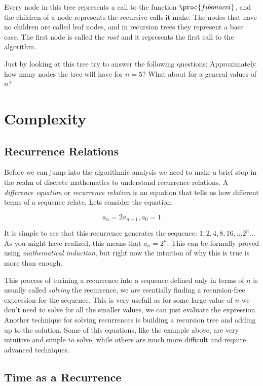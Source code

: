 \documentclass{article}
\begin{document}
Every node in this tree represents a call to the function $\proc{fibonacci}$, and the children of a node represents the recursive calls it make. The nodes that have no children are called leaf nodes, and in recursion trees they represent a base case. The first node is called the \textit{root} and it represents the first call to the algorithm.

Just by looking at this tree try to answer the following questions: Approximately how many nodes the tree will have for $n = 5$? What about for a general values of $n$?

\section{Complexity}

\subsection{Recurrence Relations}

Before we can jump into the algorithmic analysis we need to make a brief stop in the realm of discrete mathematics to understand recurrence relations. A \textit{difference equation} or \textit{recurrence relation} is an equation that tells us how different terms of a sequence relate. Lets consider the equation:

$$a_n = 2 a_{n - 1}, a_0 = 1$$

It is simple to see that this recurrence generates the sequence: $1, 2, 4, 8, 16, \dots 2^n \dots$ As you might have realized, this means that $a_n = 2^n$. This can be formally proved using \textit{mathematical induction}, but right now the intuition of why this is true is more than enough.

This process of turining a recurrence into a sequence defined only in terms of $n$ is usually called \textit{solving} the recurrence, we are esentially finding a recursion-free expression for the sequence. This is very usefull as for some large value of $n$ we don't need to solve for all the smaller values, we can just evaluate the expression. Another technique for solving recurrences is building a recursion tree and adding up to the solution. Some of this equations, like the example above, are very intuitive and simple to solve, while others are much more difficult and require advanced techniques.

\subsection{Time as a Recurrence} 
\end{document}
